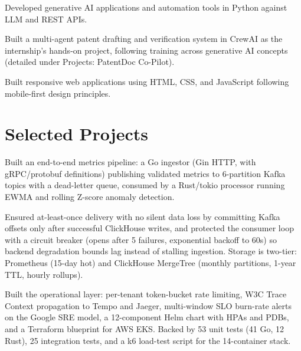 \documentclass[a4paper,10pt]{article}
\begin{document}
\begin{points}
  \item Developed generative AI applications and automation tools in Python against LLM and REST APIs.
\end{points}
\gap

\begin{points}
  \item Built a multi-agent patent drafting and verification system in CrewAI as the internship's hands-on project, following training across generative AI concepts (detailed under Projects: PatentDoc Co-Pilot).
\end{points}
\gap

\begin{points}
  \item Built responsive web applications using HTML, CSS, and JavaScript following mobile-first design principles.
\end{points}

\section{Selected Projects}

\begin{points}
  \item Built an end-to-end metrics pipeline: a Go ingestor (Gin HTTP, with gRPC/protobuf definitions) publishing validated metrics to 6-partition Kafka topics with a dead-letter queue, consumed by a Rust/tokio processor running EWMA and rolling Z-score anomaly detection.
  \item Ensured at-least-once delivery with no silent data loss by committing Kafka offsets only after successful ClickHouse writes, and protected the consumer loop with a circuit breaker (opens after 5 failures, exponential backoff to 60s) so backend degradation bounds lag instead of stalling ingestion. Storage is two-tier: Prometheus (15-day hot) and ClickHouse MergeTree (monthly partitions, 1-year TTL, hourly rollups).
  \item Built the operational layer: per-tenant token-bucket rate limiting, W3C Trace Context propagation to Tempo and Jaeger, multi-window SLO burn-rate alerts on the Google SRE model, a 12-component Helm chart with HPAs and PDBs, and a Terraform blueprint for AWS EKS. Backed by 53 unit tests (41 Go, 12 Rust), 25 integration tests, and a k6 load-test script for the 14-container stack.
\end{points}
\gap
\end{document}
